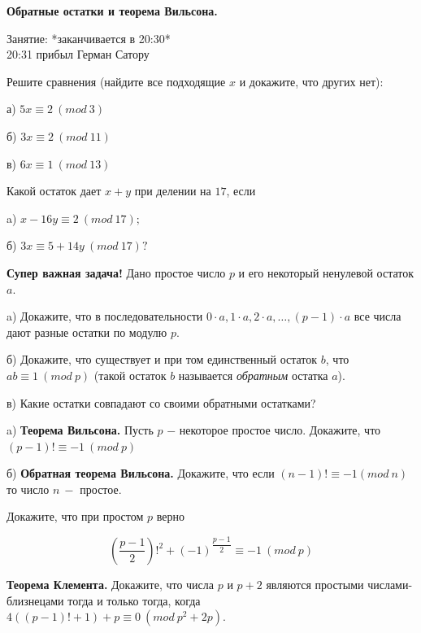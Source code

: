 \centerline{\bf \Huge Обратные остатки и теорема Вильсона.}

\begin{flushright}
        \scriptsize{Занятие: *заканчивается в 20:30*\\
                    20:31 прибыл Герман Сатору}
\end{flushright}

Решите сравнения (найдите все подходящие $x$ и докажите, что других нет):

а) $5x \equiv 2 \ (mod \ 3)$

б) $3x \equiv 2 \ (mod \ 11 )$

в) $6x \equiv 1 \ (mod \ 13)$


Какой остаток дает $x + y$ при делении на $17$, если 

a) $x - 16y \equiv 2 \ (mod \ 17);$

б) $3x \equiv 5+14y \ (mod  \ 17)?$

\textbf{Супер важная задача!} Дано простое число $p$ и его некоторый ненулевой остаток $a$.

a) Докажите, что в последовательности $0 \cdot a, 1 \cdot a, 2 \cdot a, \ldots, (p-1)\cdot a$ все числа дают разные остатки по модулю $p$.

б) Докажите, что существует и при том единственный остаток $b$, что
$ab \equiv 1 \ (mod \ p)$ (такой остаток $b$ называется \textit{обратным} остатка $a$).

в) Какие остатки совпадают со своими обратными остатками?

a) \textbf{Теорема Вильсона.} Пусть $p$ $-$ некоторое простое число. Докажите, что $(p-1)! \equiv -1 \ (mod \ p)$

\noindent
б) \textbf{Обратная теорема Вильсона.} Докажите, что если $(n-1)! \equiv -1 (mod \ n)$ то число $n \ -$ простое.

Докажите, что при простом $p$ верно 

\[ \left(\dfrac{p-1}{2}\right)!^2 + (-1)^{\dfrac{p-1}{2}} \equiv -1 \ (mod \ p)\]

\textbf{Теорема Клемента.} Докажите, что числа $p$ и  $p + 2$  являются простыми числами-близнецами тогда и только тогда, когда  $4((p-1)! + 1) + p \equiv 0 \ (mod \ p^2 + 2p).$